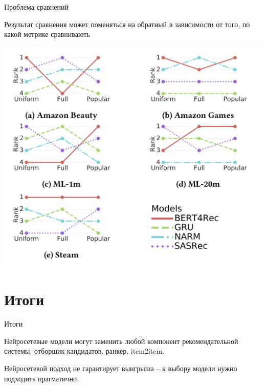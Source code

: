 \documentclass[11pt,aspectratio=169,handout]{beamer}
\begin{document}
\begin{frame}{Проблема сравнений \cite{DALMANN}}

\begin{tcolorbox}[colback=warn!5,colframe=warn!80,title=]
Результат сравнения может поменяться на обратный в зависимости от того, по какой метрике сравнивають
\end{tcolorbox}

\begin{center}
\includegraphics[scale=0.25]{images/compare.png}
\end{center}

\end{frame}

\section{Итоги}

\begin{frame}{Итоги}

\begin{tcolorbox}[colback=info!5,colframe=info!80,title=]
Нейросетевые модели могут заменить любой компонент рекомендательной системы: отборщик кандидатов, ранкер, item2item.
\end{tcolorbox}

\begin{tcolorbox}[colback=warn!5,colframe=warn!80,title=]
Нейросетевой подход не гарантирует выигрыша -- к выбору модели нужно подходить прагматично.
\end{tcolorbox}

\end{frame}
\end{document}
